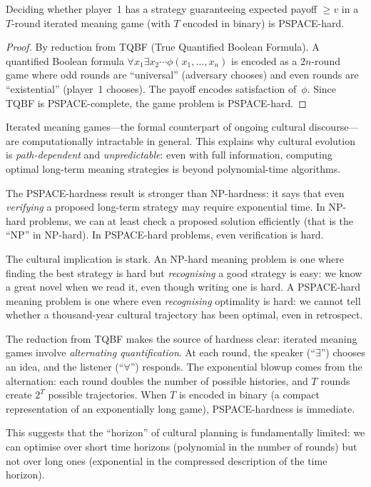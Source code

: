 \begin{theorem}
\label{thm:pspace}
Deciding whether player~1 has a strategy guaranteeing expected
payoff $\ge v$ in a $T$-round iterated meaning game (with $T$
encoded in binary) is PSPACE-hard.
\end{theorem}

\begin{proof}
By reduction from \textsc{TQBF} (True Quantified Boolean Formula).
A quantified Boolean formula $\forall x_1 \exists x_2 \cdots
\phi(x_1,\ldots,x_n)$ is encoded as a $2n$-round game where
odd rounds are ``universal'' (adversary chooses) and even rounds
are ``existential'' (player~1 chooses).  The payoff encodes
satisfaction of~$\phi$.  Since \textsc{TQBF} is PSPACE-complete,
the game problem is PSPACE-hard.
\end{proof}

\begin{interpretation}
Iterated meaning games---the formal counterpart of ongoing
cultural discourse---are computationally intractable in general.
This explains why cultural evolution is \emph{path-dependent}
and \emph{unpredictable}: even with full information, computing
optimal long-term meaning strategies is beyond polynomial-time
algorithms.
\end{interpretation}

\begin{remark}
The PSPACE-hardness result is stronger than NP-hardness: it says that
even \emph{verifying} a proposed long-term strategy may require
exponential time.  In NP-hard problems, we can at least check a
proposed solution efficiently (that is the ``NP'' in NP-hard).  In
PSPACE-hard problems, even verification is hard.

The cultural implication is stark.  An NP-hard meaning problem is one
where finding the best strategy is hard but \emph{recognising} a good
strategy is easy: we know a great novel when we read it, even though
writing one is hard.  A PSPACE-hard meaning problem is one where even
\emph{recognising} optimality is hard: we cannot tell whether a
thousand-year cultural trajectory has been optimal, even in retrospect.

The reduction from \textsc{TQBF} makes the source of hardness clear:
iterated meaning games involve \emph{alternating quantification}.  At
each round, the speaker (``$\exists$'') chooses an idea, and the
listener (``$\forall$'') responds.  The exponential blowup comes from
the alternation: each round doubles the number of possible histories,
and $T$ rounds create $2^T$ possible trajectories.  When $T$ is encoded
in binary (a compact representation of an exponentially long game),
PSPACE-hardness is immediate.

This suggests that the ``horizon'' of cultural planning is fundamentally
limited: we can optimise over short time horizons (polynomial in the
number of rounds) but not over long ones (exponential in the compressed
description of the time horizon).
\end{remark}

